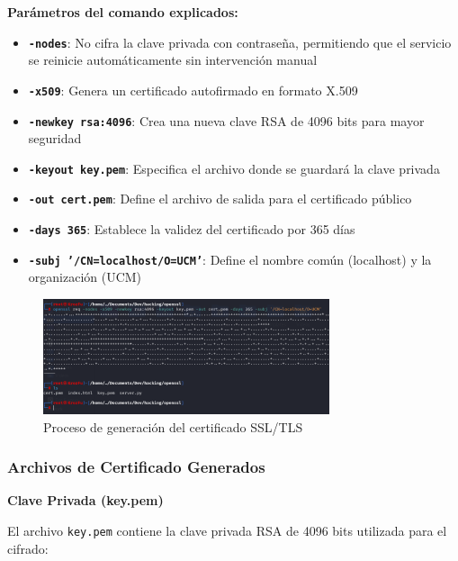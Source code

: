 \documentclass[12pt,a4paper]{article}
\begin{document}
\textbf{Parámetros del comando explicados:}

\begin{itemize}
  \item \textbf{\texttt{-nodes}}: No cifra la clave privada con contraseña, permitiendo que el servicio se reinicie automáticamente sin intervención manual
  \item \textbf{\texttt{-x509}}: Genera un certificado autofirmado en formato X.509
  \item \textbf{\texttt{-newkey rsa:4096}}: Crea una nueva clave RSA de 4096 bits para mayor seguridad
  \item \textbf{\texttt{-keyout key.pem}}: Especifica el archivo donde se guardará la clave privada
  \item \textbf{\texttt{-out cert.pem}}: Define el archivo de salida para el certificado público
  \item \textbf{\texttt{-days 365}}: Establece la validez del certificado por 365 días
  \item \textbf{\texttt{-subj '/CN=localhost/O=UCM'}}: Define el nombre común (localhost) y la organización (UCM)
\end{itemize}

\begin{figure}[H]
  \centering
  \includegraphics[width=0.75\textwidth]{./assets/img1.png}
  \caption{Proceso de generación del certificado SSL/TLS}
  \label{fig:cert-generation}
\end{figure}

\subsubsection{Archivos de Certificado Generados}

\textbf{Clave Privada (key.pem)}

El archivo \texttt{key.pem} contiene la clave privada RSA de 4096 bits
utilizada para el cifrado:
\end{document}
